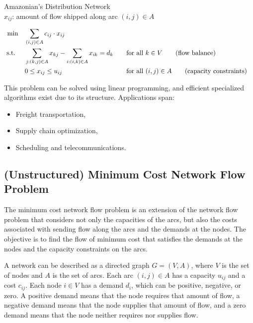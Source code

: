 \begin{example}{Amazonian's Distribution Network}{}
\smallskip {} \\
\( x_{ij} \): amount of flow shipped along arc \( (i, j) \in A \)

\smallskip {}
\begin{align*}
\min \quad & \sum_{(i,j) \in A} c_{ij} \cdot x_{ij} \\
\text{ s.t. } \quad
& \sum_{j : (k,j) \in A} x_{kj} - \sum_{i : (i,k) \in A} x_{ik} = d_k &&\quad \text{for all } k \in V   \tag{flow balance} \\
& 0 \leq x_{ij} \leq u_{ij} &&\quad \text{for all } (i,j) \in A   \tag{capacity constraints}
\end{align*}

\noindent This problem can be solved using linear programming, and efficient specialized algorithms exist due to its structure. Applications span:
\begin{itemize}
    \item Freight transportation,
    \item Supply chain optimization,
    \item Scheduling and telecommunications.
\end{itemize}
\end{example}

\subsection{(Unstructured) Minimum Cost Network Flow Problem}
The minimum cost network flow problem is an extension of the network flow problem that considers not only the capacities of the arcs, but also the costs associated with sending flow along the arcs and the demands at the nodes. The objective is to find the flow of minimum cost that satisfies the demands at the nodes and the capacity constraints on the arcs.

A network can be described as a directed graph \( G = (V, A) \), where \( V \) is the set of nodes and \( A \) is the set of arcs. Each arc \( (i, j) \in A \) has a capacity \( u_{ij} \) and a cost \( c_{ij} \). Each node \( i \in V\) has a demand \( d_i \), which can be positive, negative, or zero. A positive demand means that the node requires that amount of flow, a negative demand means that the node supplies that amount of flow, and a zero demand means that the node neither requires nor supplies flow.

